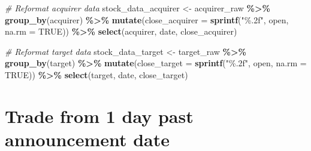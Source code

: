 \documentclass[
]{article}
\newenvironment{Shaded}{\begin{snugshade}}{\end{snugshade}}
\newcommand{\CommentTok}[1]{\textcolor[rgb]{0.56,0.35,0.01}{\textit{#1}}}
\newcommand{\DataTypeTok}[1]{\textcolor[rgb]{0.13,0.29,0.53}{#1}}
\newcommand{\KeywordTok}[1]{\textcolor[rgb]{0.13,0.29,0.53}{\textbf{#1}}}
\newcommand{\NormalTok}[1]{#1}
\newcommand{\OperatorTok}[1]{\textcolor[rgb]{0.81,0.36,0.00}{\textbf{#1}}}
\newcommand{\OtherTok}[1]{\textcolor[rgb]{0.56,0.35,0.01}{#1}}
\newcommand{\StringTok}[1]{\textcolor[rgb]{0.31,0.60,0.02}{#1}}
\begin{document}
\begin{Shaded}
\begin{Highlighting}[]
\CommentTok{\# Reformat acquirer data}
\NormalTok{stock\_data\_acquirer \textless{}{-}}\StringTok{ }\NormalTok{acquirer\_raw }\OperatorTok{\%\textgreater{}\%}
\StringTok{  }\KeywordTok{group\_by}\NormalTok{(acquirer) }\OperatorTok{\%\textgreater{}\%}\StringTok{ }
\StringTok{  }\KeywordTok{mutate}\NormalTok{(}\DataTypeTok{close\_acquirer =} \KeywordTok{sprintf}\NormalTok{(}\StringTok{"\%.2f"}\NormalTok{, open, }\DataTypeTok{na.rm =} \OtherTok{TRUE}\NormalTok{)) }\OperatorTok{\%\textgreater{}\%}
\StringTok{  }\KeywordTok{select}\NormalTok{(acquirer, date, close\_acquirer)}
\end{Highlighting}
\end{Shaded}

\begin{Shaded}
\begin{Highlighting}[]
\CommentTok{\# Reformat target data}
\NormalTok{stock\_data\_target \textless{}{-}}\StringTok{ }\NormalTok{target\_raw }\OperatorTok{\%\textgreater{}\%}
\StringTok{  }\KeywordTok{group\_by}\NormalTok{(target) }\OperatorTok{\%\textgreater{}\%}\StringTok{ }
\StringTok{  }\KeywordTok{mutate}\NormalTok{(}\DataTypeTok{close\_target =} \KeywordTok{sprintf}\NormalTok{(}\StringTok{"\%.2f"}\NormalTok{, open, }\DataTypeTok{na.rm =} \OtherTok{TRUE}\NormalTok{)) }\OperatorTok{\%\textgreater{}\%}
\StringTok{  }\KeywordTok{select}\NormalTok{(target, date, close\_target)}
\end{Highlighting}
\end{Shaded}

\hypertarget{trade-from-1-day-past-announcement-date}{%
\section{Trade from 1 day past announcement
date}\label{trade-from-1-day-past-announcement-date}}
\end{document}
